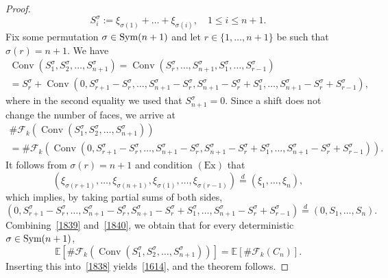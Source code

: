 \documentclass[12pt, reqno]{amsart}
\theoremstyle{plain}
\theoremstyle{definition}
\theoremstyle{remark}
\begin{document}
\begin{proof}
$$
S^{\sigma}_i:=\xi_{\sigma(1)}+\dots+\xi_{\sigma(i)}, \quad 1\leq i \leq n+1.
$$
Fix some permutation $\sigma\in {\text{\rm Sym}}(n+1)$ and let $r\in \{1,\ldots,n+1\}$ be such that $\sigma(r)=n+1$. We have
\begin{multline*}
  {\mathop{\mathrm{Conv}}\nolimits}(S^\sigma_1,S^\sigma_2,\dots,S^\sigma_{n+1})={\mathop{\mathrm{Conv}}\nolimits}(S^\sigma_{r},\dots,S^\sigma_{n+1},S^\sigma_1,\dots,S^\sigma_{r-1})\\
  =S^\sigma_{r}+{\mathop{\mathrm{Conv}}\nolimits}(0,S^\sigma_{r+1}-S^\sigma_{r},\dots,S^\sigma_{n+1}-S^\sigma_{r},S^\sigma_{n+1}-S^\sigma_{r}+S^\sigma_1,\dots,S^\sigma_{n+1}-S^\sigma_{r}+S^\sigma_{r-1}),
\end{multline*}
where in the second equality we used that $S^\sigma_{n+1}=0$. Since a shift does not change the number of faces, we arrive at
\begin{multline}\label{1839}
  \#\mathcal{F}_k({\mathop{\mathrm{Conv}}\nolimits}(S^\sigma_1,S^\sigma_2,\dots,S^\sigma_{n+1}))\\
  =\#\mathcal{F}_k({\mathop{\mathrm{Conv}}\nolimits}(0,S^\sigma_{r+1}-S^\sigma_{r},\dots,S^\sigma_{n+1}-S^\sigma_{r},S^\sigma_{n+1}-S^\sigma_{r}+S^\sigma_1,\dots,S^\sigma_{n+1}-S^\sigma_{r}+S^\sigma_{r-1})).
\end{multline}
It follows from $\sigma(r)=n+1$ and condition $(\text{Ex})$ that
$$
(\xi_{\sigma(r+1)},\dots,\xi_{\sigma(n+1)},\xi_{\sigma(1)},\dots,\xi_{\sigma(r-1)}){\stackrel{d}{=}}(\xi_1,\dots,\xi_n),
$$
which implies, by taking partial sums of both sides,
\begin{equation}\label{1840}
 (0,S^\sigma_{r+1}-S^\sigma_{r},\dots,S^\sigma_{n+1}-S^\sigma_{r},S^\sigma_{n+1}-S^\sigma_{r}+S^\sigma_1,\dots,S^\sigma_{n+1}-S^\sigma_{r}+S^\sigma_{r-1}){\stackrel{d}{=}}(0,S_1,\dots,S_n).
\end{equation}
Combining~\eqref{1839} and~\eqref{1840}, we obtain that for every deterministic $\sigma\in{\text{\rm Sym}}(n+1)$,
$$
{\mathbb E} [\#\mathcal{F}_k({\mathop{\mathrm{Conv}}\nolimits}(S^\sigma_1,S^\sigma_2,\dots,S^\sigma_{n+1}))] = {\mathbb E} [\#\mathcal{F}_k(C_n)].
$$
Inserting this into~\eqref{1838} yields~\eqref{1614}, and the theorem follows.
\end{proof}
\end{document}
